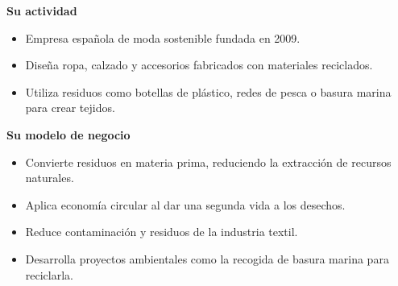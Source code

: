 

\begin{solution}
\textbf{Su actividad}
\begin{itemize}
    \item Empresa española de moda sostenible fundada en 2009.
    \item Diseña ropa, calzado y accesorios fabricados con materiales reciclados.
    \item Utiliza residuos como botellas de plástico, redes de pesca o basura marina para crear tejidos.
\end{itemize}

\textbf{Su modelo de negocio}
\begin{itemize}
    \item Convierte residuos en materia prima, reduciendo la extracción de recursos naturales.
    \item Aplica economía circular al dar una segunda vida a los desechos.
    \item Reduce contaminación y residuos de la industria textil.
    \item Desarrolla proyectos ambientales como la recogida de basura marina para reciclarla.
\end{itemize}

\end{solution}
